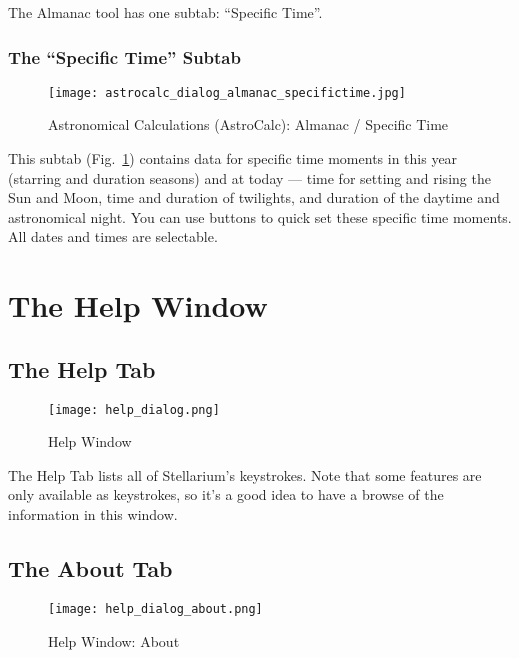 The Almanac tool has one subtab: ``Specific Time''. 

\subsubsection{The ``Specific Time'' Subtab}
\label{sec:gui:AstroCalc:Almanac:SpecificTime}

\begin{figure}[hb]
\centering\texttt{[image: astrocalc\_dialog\_almanac\_specifictime.jpg]}
\caption{Astronomical Calculations (AstroCalc): Almanac / Specific Time}
\label{fig:gui:AstroCalc:Almanac:SpecificTime}
\end{figure}

This subtab (Fig.~\ref{fig:gui:AstroCalc:Almanac:SpecificTime}) contains data for specific time moments in this year (starring and duration seasons) and at today --- time for setting and rising the Sun and Moon, time and duration of twilights, and duration of the daytime and astronomical night. You can use buttons to quick set these specific time moments. All dates and times are selectable.


\clearpage
\section{The Help Window}
\label{sec:gui:help}

\subsection{The Help Tab}
\label{sec:gui:help:help}
\begin{figure}[htp]
\centering\texttt{[image: help\_dialog.png]}
\caption{Help Window}
\label{fig:gui:help}
\end{figure}

\noindent The Help Tab lists all of Stellarium's keystrokes. Note that some
features are only available as keystrokes, so it's a good idea to have
a browse of the information in this window.

\subsection{The About Tab}
\label{sec:gui:help:about}
\begin{figure}[tbp]
\centering\texttt{[image: help\_dialog\_about.png]}
\caption{Help Window: About}
\label{fig:gui:help:about}
\end{figure}

